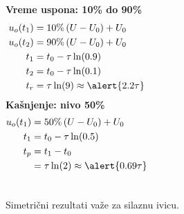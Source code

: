 \begin{frame}[label=08-s050]
\begin{columns}[T,onlytextwidth]
\textbf{Vreme uspona: 10\% do 90\%}
\begin{align*}
u_o(t_1)&=10\%\,(U-U_0)+U_0\\
u_o(t_2)&=90\%\,(U-U_0)+U_0\\
t_1&=t_0-\tau\ln(0.9)\\
t_2&=t_0-\tau\ln(0.1)\\
t_r&=\tau\ln(9)\approx\alert{2.2\tau}
\end{align*}
\textbf{Kašnjenje: nivo 50\%}
\begin{align*}
u_o(t_1)&=50\%\,(U-U_0)+U_0\\
t_1&=t_0-\tau\ln(0.5)\\
t_p&=t_1-t_0\\
&=\tau\ln(2)\approx\alert{0.69\tau}
\end{align*}
\end{columns}\medskip
Simetrični rezultati važe za silaznu ivicu.
\end{frame}
